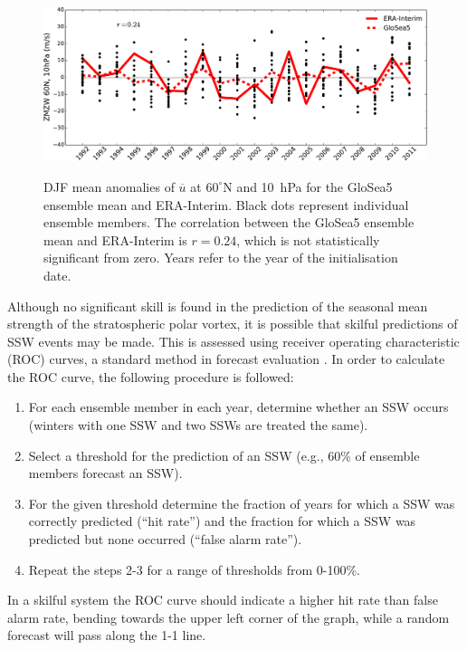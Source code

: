 \begin{figure}[t]
  \noindent\includegraphics[width=\textwidth,angle=0]{figures/chapter-seasonal/DJF_ZMZW_NH.pdf}\\
  \caption[DJF $\overline{u}$ anomalies for GloSea5.]{DJF mean anomalies of
    $\overline{u}$ at $60^{\circ}$N and 10~hPa for the GloSea5 ensemble mean and
    ERA-Interim. Black dots represent individual ensemble members. The
    correlation between the GloSea5 ensemble mean and ERA-Interim is $r=0.24$,
    which is not statistically significant from zero. Years refer to the year of
    the initialisation date.}\label{fig:nh_zmzw_timeseries}
\end{figure}

Although no significant skill is found in the prediction of the seasonal mean
strength of the stratospheric polar vortex, it is possible that skilful
predictions of SSW events may be made. This is assessed using receiver operating
characteristic (ROC) curves, a standard method in forecast evaluation
\citep[e.g.,][]{Wilks}. In order to calculate the ROC curve, the following
procedure is followed:
\begin{enumerate}[1.]
\item For each ensemble member in each year, determine whether an SSW occurs
  (winters with one SSW and two SSWs are treated the same). 
\item Select a threshold for the prediction of an SSW (e.g., 60\% of ensemble
  members forecast an SSW). 
\item For the given threshold determine the fraction of years for which a SSW
  was correctly predicted (``hit rate'') and the fraction for which a SSW was
  predicted but none occurred (``false alarm rate''). 
\item Repeat the steps 2-3 for a range of thresholds from 0-100\%.
\end{enumerate}
In a skilful system the ROC curve should indicate a higher hit rate than false
alarm rate, bending towards the upper left corner of the graph, while a random
forecast will pass along the 1-1 line. 

